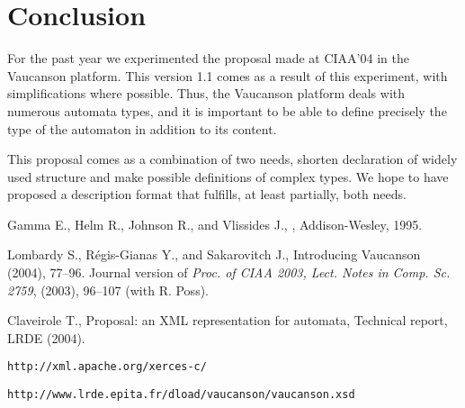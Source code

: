 \documentclass[a4paper]{llncs}
\newcommand{\Vauc}{{\sc Vaucanson}\xspace}
\begin{document}
\section{Conclusion}

For the past year we experimented the proposal made at CIAA'04 in the
\Vauc platform. This version 1.1 comes as a result of this
experiment, with simplifications where possible. Thus, the
\Vauc platform deals with numerous automata types, and it is important
to be able to define precisely the type of the automaton in addition
to its content.

This proposal comes as a combination of two needs, shorten declaration
of widely used structure and make possible definitions of complex
types. We hope to have proposed a description format that fulfills, at
least partially, both needs.

{\small%
\begin{thebibliography}{1}

{\sc Gamma E., Helm R., Johnson R., and Vlissides J.},
,
\newblock Addison-Wesley, 1995.

{\sc Lombardy S., R\'egis-Gianas Y., and Sakarovitch J.},
\newblock Introducing Vaucanson
 (2004), 77--96.
\newblock Journal version of
{\em Proc. of CIAA 2003, Lect. Notes in Comp. Sc. 2759}, (2003),
96--107
\newblock (with {\sc R. Poss}).

{\sc Claveirole T.},
\newblock Proposal: an XML representation for automata,
\newblock Technical report, LRDE (2004).


\verb+http://xml.apache.org/xerces-c/+

\verb+http://www.lrde.epita.fr/dload/vaucanson/vaucanson.xsd+
\end{thebibliography}}
\end{document}
